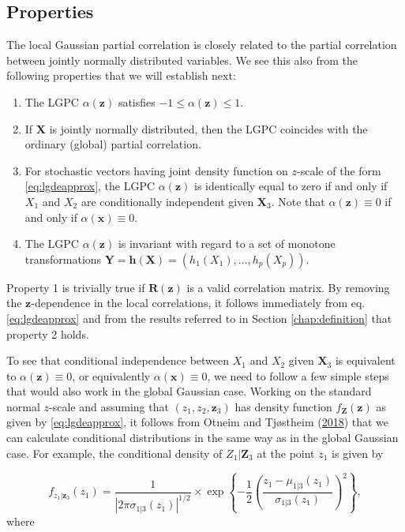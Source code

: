 \documentclass[
  12pt,
  letterpaper]{article}
\providecommand{\tightlist}{%
  \setlength{\itemsep}{0pt}\setlength{\parskip}{0pt}}
\newcommand{\X}{\bm{X}}
\newcommand{\x}{\bm{x}}
\newcommand{\Z}{\bm{Z}}
\newcommand{\z}{\bm{z}}
\newcommand{\Y}{\bm{Y}}
\newcommand{\R}{\bm{R}}
\theoremstyle{definition}
\theoremstyle{definition}
\theoremstyle{definition}
\theoremstyle{remark}
\begin{document}
\hypertarget{properties}{%
\subsection{Properties}\label{properties}}

The local Gaussian partial correlation is closely related to the partial correlation between jointly normally distributed variables. We see this also from the following properties that we will establish next:

\begin{enumerate}
\def\labelenumi{\arabic{enumi}.}
\tightlist
\item
  The LGPC \(\alpha(\z)\) satisfies \(-1 \leq \alpha(\z) \leq 1\).
\item
  If \(\X\) is jointly normally distributed, then the LGPC coincides with the ordinary (global) partial correlation.
\item
  For stochastic vectors having joint density function on \(z\)-scale of the form \eqref{eq:lgdeapprox}, the LGPC \(\alpha(\z)\) is identically equal to zero if and only if \(X_1\) and \(X_2\) are conditionally independent given \(\X_3\). Note that \(\alpha(\z) \equiv 0\) if and only if \(\alpha(\x) \equiv 0\). \label{prop:char}
\item
  The LGPC \(\alpha(\z)\) is invariant with regard to a set of monotone transformations \(\Y = \bm{h}(\X) = (h_1(X_1), \ldots, h_p(X_p))\).
\end{enumerate}

Property 1 is trivially true if \(\R(\z)\) is a valid correlation matrix. By removing the \(\z\)-dependence in the local correlations, it follows immediately from eq. \eqref{eq:lgdeapprox} and from the results referred to in Section \ref{chap:definition} that property 2 holds.

To see that conditional independence between \(X_1\) and \(X_2\) given \(\X_3\) is equivalent to \(\alpha(\z) \equiv 0\), or equivalently \(\alpha(\x) \equiv 0\), we need to follow a few simple steps that would also work in the global Gaussian case. Working on the standard normal \(z\)-scale and assuming that \((z_1, z_2, \z_3)\) has density function \(f_{\Z}(\z)\) as given by \eqref{eq:lgdeapprox}, it follows from Otneim and Tjøstheim (\protect\hyperlink{ref-otneim2017conditional}{2018}) that we can calculate conditional distributions in the same way as in the global Gaussian case. For example, the conditional density of \(Z_1|\Z_3\) at the point \(z_1\) is given by

\[f_{z_1|\z_3}(z_1) = \frac{1}{|2\pi\sigma_{1|3}(z_1)|^{1/2}}\times\exp \left\{-\frac{1}{2}\left(\frac{z_1 - \mu_{1|3}(z_1)}{\sigma_{1|3}(z_1)}\right)^2\right\},\]
where
\end{document}
